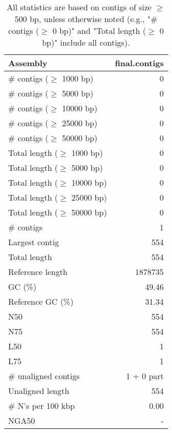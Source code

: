 \documentclass[12pt,a4paper]{article}
\begin{document}
\begin{table}[ht]
\begin{center}
\caption{All statistics are based on contigs of size $\geq$ 500 bp, unless otherwise noted (e.g., "\# contigs ($\geq$ 0 bp)" and "Total length ($\geq$ 0 bp)" include all contigs).}
\begin{tabular}{|l*{1}{|r}|}
\hline
Assembly & final.contigs \\ \hline
\# contigs ($\geq$ 1000 bp) & 0 \\ \hline
\# contigs ($\geq$ 5000 bp) & 0 \\ \hline
\# contigs ($\geq$ 10000 bp) & 0 \\ \hline
\# contigs ($\geq$ 25000 bp) & 0 \\ \hline
\# contigs ($\geq$ 50000 bp) & 0 \\ \hline
Total length ($\geq$ 1000 bp) & 0 \\ \hline
Total length ($\geq$ 5000 bp) & 0 \\ \hline
Total length ($\geq$ 10000 bp) & 0 \\ \hline
Total length ($\geq$ 25000 bp) & 0 \\ \hline
Total length ($\geq$ 50000 bp) & 0 \\ \hline
\# contigs & 1 \\ \hline
Largest contig & 554 \\ \hline
Total length & 554 \\ \hline
Reference length & 1878735 \\ \hline
GC (\%) & 49.46 \\ \hline
Reference GC (\%) & 31.34 \\ \hline
N50 & 554 \\ \hline
N75 & 554 \\ \hline
L50 & 1 \\ \hline
L75 & 1 \\ \hline
\# unaligned contigs & 1 + 0 part \\ \hline
Unaligned length & 554 \\ \hline
\# N's per 100 kbp & 0.00 \\ \hline
NGA50 & - \\ \hline
\end{tabular}
\end{center}
\end{table}
\end{document}
